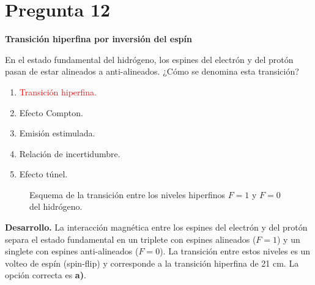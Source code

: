 \documentclass[a4paper,11pt]{article}
\newcommand{\pregunta}[2]{\section*{Pregunta #1}\textbf{#2}\par}
\begin{document}
\pregunta{12}{Transición hiperfina por inversión del espín}

En el estado fundamental del hidrógeno, los espines del electrón y del protón pasan de estar alineados a anti-alineados. ¿Cómo se denomina esta transición?

\begin{enumerate}
    \item \textcolor{red}{Transición hiperfina.}
    \item Efecto Compton.
    \item Emisión estimulada.
    \item Relación de incertidumbre.
    \item Efecto túnel.
\end{enumerate}

\begin{figure}[H]
\centering

\caption{Esquema de la transición entre los niveles hiperfinos $F=1$ y $F=0$ del hidrógeno.}
\end{figure}

\textbf{Desarrollo.} La interacción magnética entre los espines del electrón y del protón separa el estado fundamental en un triplete con espines alineados ($F=1$) y un singlete con espines anti-alineados ($F=0$). La transición entre estos niveles es un volteo de espín (spin-flip) y corresponde a la transición hiperfina de 21 cm. La opción correcta es \textbf{a)}. \parencite[Sec. 20.7, ecs. (20.82)--(20.84), pp. 683--689]{chaparro2026}

\printbibliography[title={Referencia}]
\end{document}
